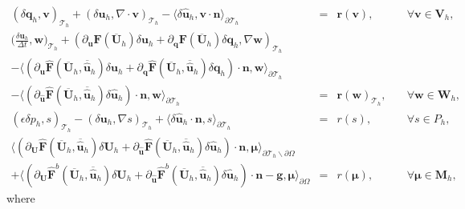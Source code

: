 \documentclass[11pt]{article}
\begin{document}
\begin{equation}
\begin{array}{rcll}
(\delta \bm{q}_h, \bm{v})_{\mathcal{T}_h} + (\delta \bm{u}_h, \nabla \cdot \bm{v})_{\mathcal{T}_h} - \langle \delta \widehat{\bm{u}}_h, \bm{v} \cdot \bm{n} \rangle_{\partial \mathcal{T}_h}  & = & \bm{r}(\bm{v}), & \quad \forall \bm{v} \in \bm{V}_h, \\[2ex] 
\displaystyle \Big(\frac{\delta \bm{u}_h}{\Delta t}, \bm{w} \Big)_{\mathcal{T}_h} + (\partial_{\bm{u}} \bm{F} (\overline{\bm{U}}_h) \delta \bm{u}_h + \partial_{\bm{q}} \bm{F} (\overline{\bm{U}}_h) \delta \bm{q}_h, \nabla \bm{w})_{\mathcal{T}_h} & & \\[2ex]
- \langle (\partial_{\bm{u}} \widehat{\bm{F}} (\overline{\bm{U}}_h,\overline{\widehat{\bm{u}}}_h) \delta \bm{u}_h + \partial_{{\bm{q}}} \widehat{\bm{F}} (\overline{\bm{U}}_h,\overline{\widehat{\bm{u}}}_h) \delta {\bm{q}}_h) \cdot \bm{n}, \bm{w} \rangle_{\partial \mathcal{T}_h} & & \\[2ex]
 - \langle (\partial_{\widehat{\bm{u}}} \widehat{\bm{F}} (\overline{\bm{U}}_h,  \overline{\widehat{\bm{u}}}_h) \delta \widehat{\bm{u}}_h) \cdot \bm{n}, \bm{w} \rangle_{\partial \mathcal{T}_h}   & = &  \bm{r}(\bm{w})_{\mathcal{T}_h},  & \quad \forall \bm{w} \in \bm{W}_h, \\[2ex]
 (\epsilon \delta p_h, s)_{\mathcal{T}_h} - (\delta \bm{u}_h, \nabla s)_{\mathcal{T}_h} + \langle \delta \widehat{\bm{u}}_h \cdot \bm{n},s \rangle_{\partial \mathcal{T}_h}  & = & r(s), & \quad \forall s \in P_h, \\[2ex]
 \langle (\partial_{\bm{U}} \widehat{\bm{F}} (\overline{\bm{U}}_h, \overline{\widehat{\bm{u}}}_h) \delta\bm{U}_h + \partial_{\widehat{\bm{u}}} \widehat{\bm{F}} (\overline{\bm{U}}_h, \overline{\widehat{\bm{u}}}_h) \delta \widehat{\bm{u}}_h ) \cdot \bm{n}, \bm{\mu} \rangle_{\partial \mathcal{T}_h \backslash \partial \Omega} & & \\[2ex]
  + \langle (\partial_{\bm{U}} \widehat{\bm{F}}^b (\overline{\bm{U}}_h, \overline{\widehat{\bm{u}}}_h) \delta\bm{U}_h + \partial_{\widehat{\bm{u}}} \widehat{\bm{F}}^b (\overline{\bm{U}}_h, \overline{\widehat{\bm{u}}}_h) \delta \widehat{\bm{u}}_h ) \cdot \bm{n}  - \bm{g}, \bm{\mu} \rangle_{\partial \Omega}  & = & r(\bm{\mu}), & \quad \forall \bm{\mu} \in \bm{M}_h ,
\end{array}
\end{equation}
where
\end{document}
